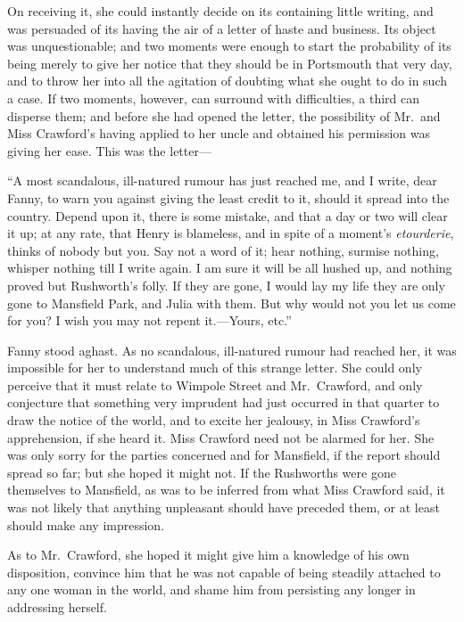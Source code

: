 \documentclass{article}
\begin{document}
On receiving it, she could instantly decide on its
containing little writing, and was persuaded of its
having the air of a letter of haste and business.
Its object was unquestionable; and two moments were
enough to start the probability of its being merely
to give her notice that they should be in Portsmouth
that very day, and to throw her into all the agitation
of doubting what she ought to do in such a case.
If two moments, however, can surround with difficulties,
a third can disperse them; and before she had opened
the letter, the possibility of Mr.\ and Miss Crawford's
having applied to her uncle and obtained his permission
was giving her ease.  This was the letter---%

``A most scandalous, ill-natured rumour has just reached me,
and I write, dear Fanny, to warn you against giving the
least credit to it, should it spread into the country.
Depend upon it, there is some mistake, and that a day or two
will clear it up; at any rate, that Henry is blameless,
and in spite of a moment's \emph{etourderie}, thinks of
nobody but you.  Say not a word of it; hear nothing,
surmise nothing, whisper nothing till I write again.
I am sure it will be all hushed up, and nothing proved
but Rushworth's folly.  If they are gone, I would lay
my life they are only gone to Mansfield Park, and Julia
with them.  But why would not you let us come for you?
I wish you may not repent it.---Yours, etc.''

Fanny stood aghast.  As no scandalous, ill-natured rumour
had reached her, it was impossible for her to understand
much of this strange letter.  She could only perceive
that it must relate to Wimpole Street and Mr.\ Crawford,
and only conjecture that something very imprudent had just
occurred in that quarter to draw the notice of the world,
and to excite her jealousy, in Miss Crawford's apprehension,
if she heard it.  Miss Crawford need not be alarmed
for her.  She was only sorry for the parties concerned
and for Mansfield, if the report should spread so far;
but she hoped it might not.  If the Rushworths were gone
themselves to Mansfield, as was to be inferred from
what Miss Crawford said, it was not likely that anything
unpleasant should have preceded them, or at least should
make any impression.

As to Mr.\ Crawford, she hoped it might give him a knowledge
of his own disposition, convince him that he was not capable
of being steadily attached to any one woman in the world,
and shame him from persisting any longer in addressing herself.
\end{document}
